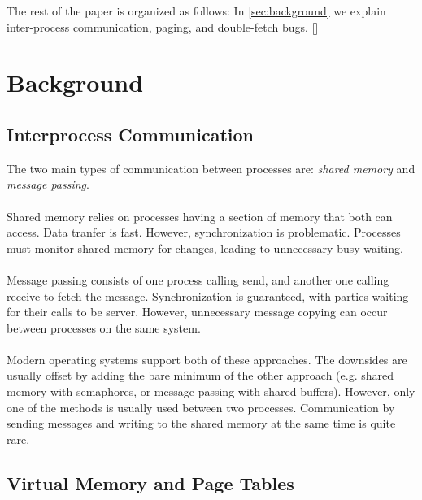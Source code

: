 The rest of the paper is organized as follows: In \autoref{sec:background} we explain inter-process communication, paging, and double-fetch bugs. \autoref{}
\section{Background}

\label{sec:background}
\subsection{Interprocess Communication}

The two main types of communication between processes are: \emph{shared memory} and \emph{message passing}\cite{silberschatz2018operating}.
\\
\\
Shared memory relies on processes having a section of memory that both can access. Data tranfer is fast.
However, synchronization is problematic. Processes must monitor shared memory for changes, leading to unnecessary busy waiting.
\\
\\
Message passing consists of one process calling send, and another one calling receive to fetch the message.
Synchronization is guaranteed, with parties waiting for their calls to be server. However, unnecessary message 
copying can occur between processes on the same system.
\\
\\
Modern operating systems support both of these approaches. The downsides are usually offset by adding the 
bare minimum of the other approach (e.g. shared memory with semaphores, or message passing with shared buffers). 
However, only one of the methods is usually used between two processes. Communication by sending messages and writing
to the shared memory at the same time is quite rare.

\subsection{Virtual Memory and Page Tables} \label{sec:vm}

